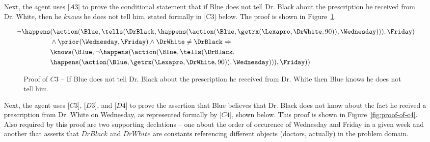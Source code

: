 \noindent Next, the agent uses [$A3$] to prove the conditional statement that if Blue does not tell Dr. Black about the prescription he received from Dr. White, then he \emph{knows} he does not tell him, stated formally in [C3] below.  The proof is shown in Figure~\ref{fig:proof-of-c3}.

\begin{footnotesize}
\begin{align*}
[C3] \ \neg \happens&(\action(\Blue,\tells(\DrBlack,\happens(\action(\Blue,\getrx(\Lexapro,\DrWhite,90)),\Wednesday))),\Friday) \\
& \wedge \prior(\Wednesday,\Friday) \wedge \DrWhite \neq \DrBlack \Rightarrow \\
& \knows(\Blue, \neg \happens(\action(\Blue,\tells(\DrBlack,\\ 
& \happens(\action(\Blue,\getrx(\Lexapro,\DrWhite,90)),\Wednesday))),\Friday))
\end{align*}
\end{footnotesize}

\begin{figure}[h!] 
\vspace{6pt}
\label{fig:proof-of-c3}
\centering
{}
\caption{Proof of $C3$ -- If Blue does not tell Dr. Black about the prescription he received from Dr. White then Blue knows he does not tell him.}
\end{figure}



\noindent Next, the agent uses [$C3$], [$D3$], and [$D4$] to prove the assertion that Blue believes that Dr. Black does not know about the fact he reeived a prescription from Dr. White on Wednesday, as represented formally by [$C4$], shown below.  This proof is shown in Figure~\ref{fig:proof-of-c4}.  Also required by this proof are two supporting declations -- one about the order of occurence of Wednesday and Friday in a given week and another that asserts that $DrBlack$ and $DrWhite$ are constants referencing different objects (doctors, actually) in the problem domain.

